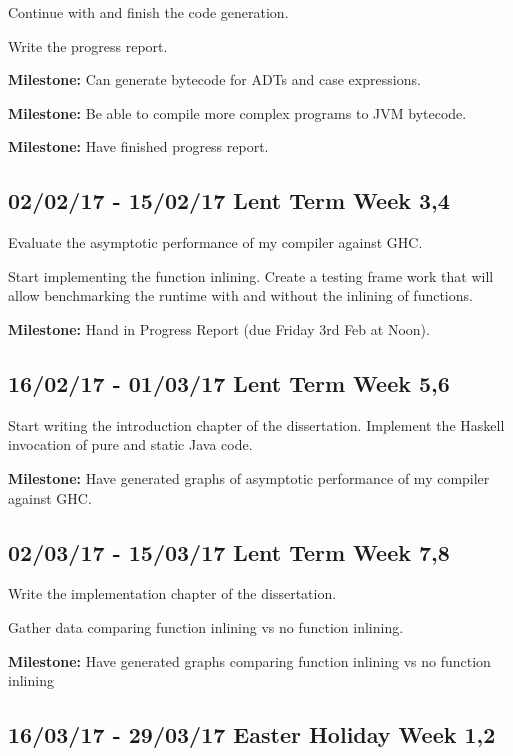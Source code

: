\documentclass[a4paper]{article}
\begin{document}
    Continue with and finish the code generation. 

    Write the progress report.

    \textbf{Milestone:} Can generate bytecode for ADTs and case expressions.
    
    \textbf{Milestone:} Be able to compile more complex programs to JVM bytecode.

    \textbf{Milestone:} Have finished progress report.

    \subsection*{02/02/17 - 15/02/17 \hfill Lent Term Week 3,4}
      
      Evaluate the asymptotic performance of my compiler against GHC.

      Start implementing the function inlining. Create a testing frame work that will allow benchmarking the runtime with and without the
      inlining of functions.


      \textbf{Milestone:} Hand in Progress Report (due Friday 3rd Feb at Noon).

    \subsection*{16/02/17 - 01/03/17 \hfill Lent Term Week 5,6}

      Start writing the introduction chapter of the dissertation. Implement the Haskell invocation of pure and static Java code.

      \textbf{Milestone:} Have generated graphs of asymptotic performance of my compiler against GHC.

    \subsection*{02/03/17 - 15/03/17 \hfill Lent Term Week 7,8}

      Write the implementation chapter of the dissertation.

      Gather data comparing function inlining vs no function inlining.

     \textbf{Milestone:} Have generated graphs comparing function inlining vs no function inlining

    \subsection*{16/03/17 - 29/03/17 \hfill Easter Holiday Week 1,2}
\end{document}
